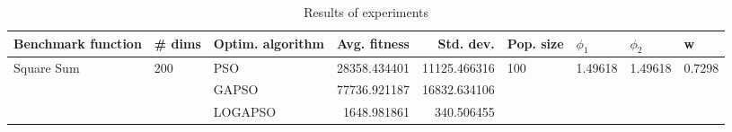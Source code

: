 \begin{table}
\centering
\caption{Results of experiments}
\begin{tabular}{lllrrllll}
\toprule
         Benchmark function &              \# dims & Optim. algorithm &  Avg. fitness &    Std. dev. &            Pop. size &               $\phi_{1}$ &               $\phi_{2}$ &                       w \\
\midrule
\multirow{3}{*}{Square Sum} & \multirow{3}{*}{200} &              PSO &  28358.434401 & 11125.466316 & \multirow{3}{*}{100} & \multirow{3}{*}{1.49618} & \multirow{3}{*}{1.49618} & \multirow{3}{*}{0.7298} \\
                            &                      &            GAPSO &  77736.921187 & 16832.634106 &                      &                          &                          &                         \\
                            &                      &          LOGAPSO &   1648.981861 &   340.506455 &                      &                          &                          &                         \\
\bottomrule
\end{tabular}
\end{table}
